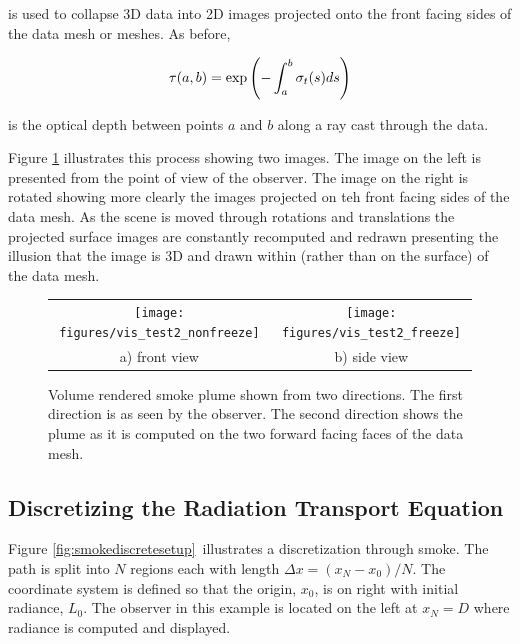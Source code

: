 is used to collapse 3D data into 2D images projected onto the front facing sides of the data mesh or meshes. As before,

\begin{equation}
\label{eq:optdepth}
\tau(a,b)=\exp\left({-\int_a^b \sigma_t(s) ds}\right)
\end{equation}

is the optical depth between points $a$ and $b$ along a ray cast through the data.

Figure \ref{fig:volplume_example} illustrates this process showing two images.  
The image on the left is presented from the point of view of the observer.  The image on the right is rotated showing more clearly the images projected on teh front facing sides of the data mesh.  As the scene is moved through rotations and translations the projected surface images are constantly recomputed and redrawn presenting the illusion that the image is 3D and drawn within (rather than on the surface) of the data mesh.

\begin{figure}[\figoptions]
\begin{center}
\begin{tabular}{cc}
\texttt{[image: figures/vis\_test2\_nonfreeze]}&
\texttt{[image: figures/vis\_test2\_freeze]}\\
a) front view&b) side view\\
\end{tabular}
\end{center}
\caption[Volume rendered smoke plume shown from two directions.]{Volume rendered smoke plume shown from two directions.
The first direction is as seen by the observer.  The second direction shows
the plume as it is computed on the two forward facing faces of the data mesh.
}
\label{fig:volplume_example}
\end{figure}

\subsection{Discretizing the Radiation Transport Equation}
\newcommand{\htau}[1]{\tau_{#1}^{N-1}}
\newcommand{\sigai}[1]{\sigma_{a,#1}}
\newcommand{\Lei}[1]{L_{e,#1}}
\newcommand{\Lhatj}[1]{L_{#1}^N}
\newcommand{\Lhatjj}[1]{\hat{L}_{#1}^N}
\newcommand{\Chatjj}[1]{\hat{C}_{#1}^N}
\newcommand{\Leii}[1]{\hat{L}_{e,#1}}


Figure \ref{fig:smokediscretesetup}\ illustrates a discretization through  smoke.  The path is split into $N$ regions each with length $\Delta x=(x_N-x_0)/N$.  The coordinate system is defined so that the origin, $x_0$, is on right with initial radiance, $L_0$.  The observer in this example is located on the left at $x_N=D$  where radiance is computed and displayed.  

